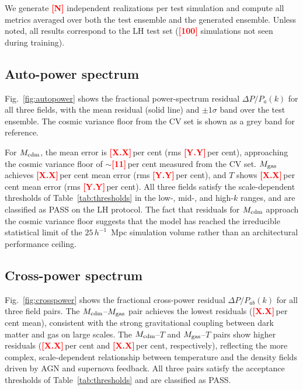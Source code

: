 \documentclass[usenatbib]{mnras}
\newcommand{\FILL}[1]{\textcolor{red}{\textbf{[#1]}}}
\newcommand{\Mcdm}{M_{\rm cdm}}
\newcommand{\Mgas}{M_{\rm gas}}
\newcommand{\Tgas}{T}
\newcommand{\DeltaP}{\Delta P/P}
\begin{document}
We generate \FILL{N} independent realizations per test simulation and
compute all metrics averaged over both the test ensemble and the
generated ensemble.
Unless noted, all results correspond to the LH test set (\FILL{100}
simulations not seen during training).

\subsection{Auto-power spectrum}
\label{sec:res_auto}

Fig.~\ref{fig:autopower} shows the fractional power-spectrum residual
$\DeltaP_a(k)$ for all three fields, with the mean residual (solid
line) and $\pm1\sigma$ band over the test ensemble.
The cosmic variance floor from the CV set is shown as a grey band for
reference.

For $\Mcdm$, the mean error is \FILL{X.X}\,per cent
(rms \FILL{Y.Y}\,per cent), approaching the cosmic variance floor of
$\sim$\FILL{11}\,per cent measured from the CV set.
$\Mgas$ achieves \FILL{X.X}\,per cent mean error
(rms \FILL{Y.Y}\,per cent), and $\Tgas$ shows \FILL{X.X}\,per cent
mean error (rms \FILL{Y.Y}\,per cent).
All three fields satisfy the scale-dependent thresholds of
Table~\ref{tab:thresholds} in the low-, mid-, and high-$k$ ranges, and
are classified as PASS on the LH protocol.
The fact that residuals for $\Mcdm$ approach the cosmic variance floor
suggests that the model has reached the irreducible statistical limit of
the $25\,h^{-1}$~Mpc simulation volume rather than an architectural
performance ceiling.

\subsection{Cross-power spectrum}
\label{sec:res_cross}

Fig.~\ref{fig:crosspower} shows the fractional cross-power residual
$\DeltaP_{ab}(k)$ for all three field pairs.
The $\Mcdm$--$\Mgas$ pair achieves the lowest residuals
(\FILL{X.X}\,per cent mean), consistent with the strong gravitational
coupling between dark matter and gas on large scales.
The $\Mcdm$--$\Tgas$ and $\Mgas$--$\Tgas$ pairs show higher residuals
(\FILL{X.X}\,per cent and \FILL{X.X}\,per cent, respectively),
reflecting the more complex, scale-dependent relationship between
temperature and the density fields driven by AGN and supernova feedback.
All three pairs satisfy the acceptance thresholds of
Table~\ref{tab:thresholds} and are classified as PASS.
\end{document}
